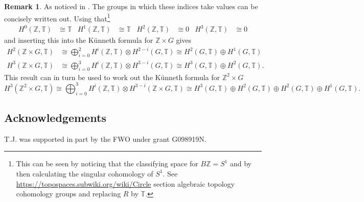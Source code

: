 \documentclass[12pt,a4paper,twoside]{article}
\newcommand{\ZZ}{\mathbb Z}
\newcommand{\TT}{\mathbb T}
\theoremstyle{definition}
\newtheorem{remark}[theorem]{Remark}
\numberwithin{equation}{section}
\begin{document}
\begin{remark}
As noticed in \cite{Chen_2013}. The groups in which these indices take values can be concisely written out. Using that\footnote{This can be seen by noticing that the classifying space for $B\ZZ=S^1$ and by then calculating the singular cohomology of $S^1$. See \url{https://topospaces.subwiki.org/wiki/Circle} section algebraic topology cohomology groups and replacing $R$ by $\TT$.}
	\begin{align}
		H^0(\ZZ,\TT)&\cong \TT& H^1(\ZZ,\TT)&\cong \TT& H^2(\ZZ,\TT)&\cong 0&H^3(\ZZ,\TT)&\cong 0
	\end{align}
	and inserting this into the K\"unneth formula for $\ZZ\times G$ gives
	\begin{align}
		H^2(\ZZ \times G,\TT)&\cong \bigoplus_{i=0}^2 H^i(\ZZ,\TT)\otimes H^{2-i}(G,\TT)\cong H^2(G,\TT)\oplus H^1(G,\TT)\\
		H^3(\ZZ \times G,\TT)&\cong \bigoplus_{i=0}^3 H^i(\ZZ,\TT)\otimes H^{3-i}(G,\TT)\cong H^3(G,\TT)\oplus H^2(G,\TT).
	\end{align}
	This result can in turn be used to work out the K\"unneth formula for $\ZZ^2\times G$
	\begin{equation}
		H^3(\ZZ^2\times G,\TT)\cong \bigoplus_{i=0}^3 H^i(\ZZ,\TT)\otimes H^{3-i}(\ZZ\times G,\TT)\cong H^3(G,\TT)\oplus H^2(G,\TT)\oplus H^2(G,\TT)\oplus H^1(G,\TT).
	\end{equation}
\end{remark}
\subsection*{Acknowledgements}
T.J. was supported in part by the FWO under grant G098919N.
\clearpage
\end{document}
